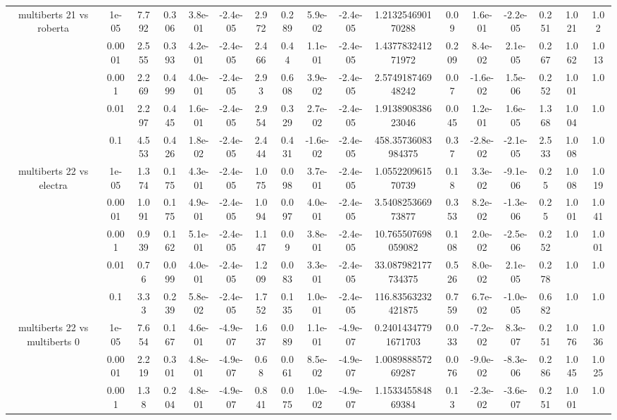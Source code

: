 \begin{tabular}{|c|c|c|c|c|c|c|c|c|c|c|c|c|c|c|c|c|}
\hline
\multirow{5}{*}{multiberts 21 vs roberta } & 1e-05 & 7.792 & 0.306 & 3.8e-01 & -2.4e-05 & 2.972 & 0.289 & 5.9e-02 & -2.4e-05 & 1.213254690170288 & 0.09 & 1.6e-01 & -2.2e-05 & 0.251 & 1.021 & 1.02 \\
 & 0.0001 & 2.555 & 0.393 & 4.2e-01 & -2.4e-05 & 2.466 & 0.44 & 1.1e-01 & -2.4e-05 & 1.437783241271972 & 0.209 & 8.4e-02 & 2.1e-05 & 0.267 & 1.062 & 1.013 \\
 & 0.001 & 2.269 & 0.499 & 4.0e-01 & -2.4e-05 & 2.93 & 0.608 & 3.9e-02 & -2.4e-05 & 2.574918746948242 & 0.07 & -1.6e-02 & 1.5e-06 & 0.252 & 1.001 & 1.0 \\
 & 0.01 & 2.297 & 0.445 & 1.6e-01 & -2.4e-05 & 2.954 & 0.329 & 2.7e-02 & -2.4e-05 & 1.913890838623046 & 0.045 & 1.2e-01 & 1.6e-05 & 1.368 & 1.004 & 1.0 \\
 & 0.1 & 4.553 & 0.426 & 1.8e-02 & -2.4e-05 & 2.444 & 0.431 & -1.6e-02 & -2.4e-05 & 458.35736083984375 & 0.37 & -2.8e-02 & -2.1e-05 & 2.533 & 1.008 & 1.0 \\
\hline
\multirow{5}{*}{multiberts 22 vs electra } & 1e-05 & 1.374 & 0.175 & 4.3e-01 & -2.4e-05 & 1.075 & 0.098 & 3.7e-01 & -2.4e-05 & 1.055220961570739 & 0.18 & 3.3e-02 & -9.1e-06 & 0.25 & 1.008 & 1.019 \\
 & 0.0001 & 1.091 & 0.175 & 4.9e-01 & -2.4e-05 & 1.094 & 0.097 & 4.0e-01 & -2.4e-05 & 3.540825366973877 & 0.353 & 8.2e-02 & -1.3e-06 & 0.25 & 1.001 & 1.041 \\
 & 0.001 & 0.939 & 0.162 & 5.1e-01 & -2.4e-05 & 1.147 & 0.09 & 3.8e-01 & -2.4e-05 & 10.765507698059082 & 0.108 & 2.0e-02 & -2.5e-06 & 0.252 & 1.0 & 1.001 \\
 & 0.01 & 0.76 & 0.099 & 4.0e-01 & -2.4e-05 & 1.209 & 0.083 & 3.3e-01 & -2.4e-05 & 33.087982177734375 & 0.526 & 8.0e-02 & 2.1e-05 & 0.278 & 1.0 & 1.0 \\
 & 0.1 & 3.33 & 0.239 & 5.8e-02 & -2.4e-05 & 1.752 & 0.135 & 1.0e-01 & -2.4e-05 & 116.83563232421875 & 0.759 & 6.7e-02 & -1.0e-05 & 0.682 & 1.0 & 1.0 \\
\hline
\multirow{5}{*}{multiberts 22 vs multiberts 0} & 1e-05 & 7.654 & 0.167 & 4.6e-01 & -4.9e-07 & 1.637 & 0.089 & 1.1e-01 & -4.9e-07 & 0.24014347791671703 & 0.033 & -7.2e-02 & 8.3e-07 & 0.251 & 1.076 & 1.036 \\
 & 0.0001 & 2.219 & 0.301 & 4.8e-01 & -4.9e-07 & 0.68 & 0.061 & 8.5e-02 & -4.9e-07 & 1.008988857269287 & 0.076 & -9.0e-02 & -8.3e-06 & 0.286 & 1.045 & 1.025 \\
 & 0.001 & 1.38 & 0.204 & 4.8e-01 & -4.9e-07 & 0.841 & 0.075 & 1.0e-02 & -4.9e-07 & 1.153345584869384 & 0.13 & -2.3e-02 & -3.6e-07 & 0.251 & 1.001 & 1.0 \\

\end{tabular}
